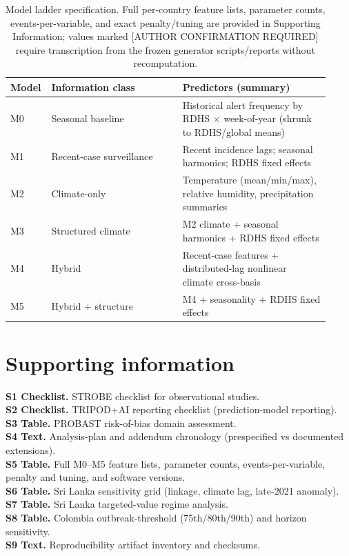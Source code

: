 \documentclass[11pt,a4paper]{article}
\begin{document}
\begin{table}[htbp]
\centering
\caption{Model ladder specification. Full per-country feature lists, parameter counts, events-per-variable, and exact penalty/tuning are provided in Supporting Information; values marked [AUTHOR CONFIRMATION REQUIRED] require transcription from the frozen generator scripts/reports without recomputation.}
\label{tab:modelspec}
\small
\begin{tabular}{p{0.07\linewidth}p{0.40\linewidth}p{0.45\linewidth}}
\toprule
Model & Information class & Predictors (summary) \\
\midrule
M0 & Seasonal baseline & Historical alert frequency by RDHS $\times$ week-of-year (shrunk to RDHS/global means) \\
M1 & Recent-case surveillance & Recent incidence lags; seasonal harmonics; RDHS fixed effects \\
M2 & Climate-only & Temperature (mean/min/max), relative humidity, precipitation summaries \\
M3 & Structured climate & M2 climate + seasonal harmonics + RDHS fixed effects \\
M4 & Hybrid & Recent-case features + distributed-lag nonlinear climate cross-basis \\
M5 & Hybrid + structure & M4 + seasonality + RDHS fixed effects \\
\bottomrule
\end{tabular}
\end{table}

\section*{Supporting information}
\noindent\textbf{S1 Checklist.} STROBE checklist for observational studies.\\
\textbf{S2 Checklist.} TRIPOD+AI reporting checklist (prediction-model reporting).\\
\textbf{S3 Table.} PROBAST risk-of-bias domain assessment.\\
\textbf{S4 Text.} Analysis-plan and addendum chronology (prespecified vs documented extensions).\\
\textbf{S5 Table.} Full M0--M5 feature lists, parameter counts, events-per-variable, penalty and tuning, and software versions.\\
\textbf{S6 Table.} Sri Lanka sensitivity grid (linkage, climate lag, late-2021 anomaly).\\
\textbf{S7 Table.} Sri Lanka targeted-value regime analysis.\\
\textbf{S8 Table.} Colombia outbreak-threshold (75th/80th/90th) and horizon sensitivity.\\
\textbf{S9 Text.} Reproducibility artifact inventory and checksums.



\end{document}
